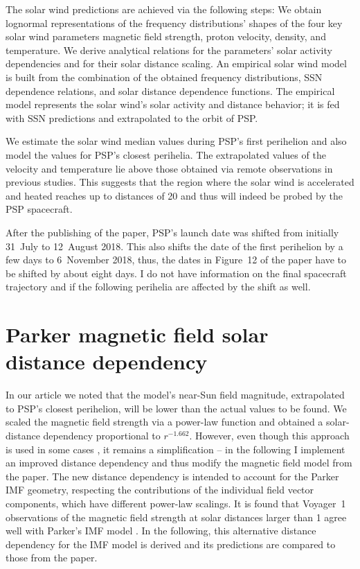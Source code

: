 The solar wind predictions are achieved via the following steps: We obtain lognormal representations of the frequency distributions’ shapes of the four key solar wind parameters magnetic field strength, proton velocity, density, and temperature. We derive analytical relations for the parameters’ solar activity dependencies and for their solar distance scaling. An empirical solar wind model is built from the combination of the obtained frequency distributions, SSN dependence relations, and solar distance dependence functions. The empirical model represents the solar wind’s solar activity and distance behavior; it is fed with SSN predictions and extrapolated to the orbit of PSP.

We estimate the solar wind median values during PSP’s first perihelion and also model the values for PSP’s closest perihelia. The extrapolated values of the velocity and temperature lie above those obtained via remote observations in previous studies. This suggests that the region where the solar wind is accelerated and heated reaches up to distances of \SI{20}{\Rs} and thus will indeed be probed by the PSP spacecraft.

After the publishing of the paper, PSP's launch date was shifted from initially 31~July to 12~August 2018. This also shifts the date of the first perihelion by a few days to 6~November 2018, thus, the dates in Figure~12 of the paper have to be shifted by about eight days. I do not have information on the final spacecraft trajectory and if the following perihelia are affected by the shift as well.


\section{Parker magnetic field solar distance dependency}
\label{sec:Parker_IMF_solar_distance_dependency}
In our article we noted that the model's near-Sun field magnitude, extrapolated to PSP's closest perihelion, will be lower than the actual values to be found. We scaled the magnetic field strength via a power-law function and obtained a solar-distance dependency proportional to $r^{-1.662}$. However, even though this approach is used in some cases \citep[e.g.,][]{Coleman1969,Hellinger2013}, it remains a simplification -- in the following I implement an improved distance dependency and thus modify the magnetic field model from the paper. The new distance dependency is intended to account for the Parker IMF geometry, respecting the contributions of the individual field vector components, which have different power-law scalings. It is found that Voyager~1 observations of the magnetic field strength at solar distances larger than \SI{1}{\au} agree well with Parker’s IMF model \citep{Burlaga1984,Burlaga2002}. In the following, this alternative distance dependency for the IMF model is derived and its predictions are compared to those from the paper.

